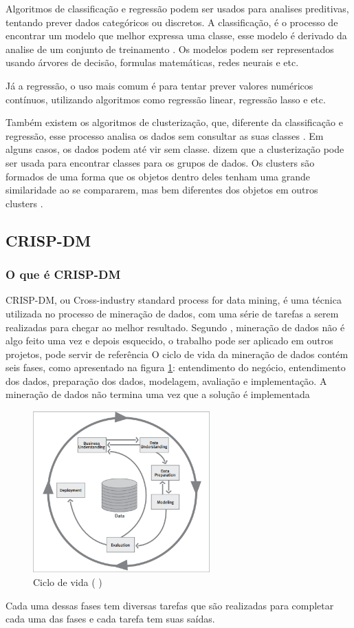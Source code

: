 Algoritmos de classificação e regressão podem ser usados para analises preditivas, tentando prever dados categóricos ou discretos. A classificação, é o processo de encontrar um modelo que melhor expressa uma classe, esse modelo é derivado da analise de um conjunto de treinamento \citep{jmj}. Os modelos podem ser representados usando árvores de decisão, formulas matemáticas, redes neurais e etc.

Já a regressão, o uso mais comum é para tentar prever valores numéricos contínuos, utilizando algoritmos como regressão linear, regressão lasso e etc.

Também existem os algoritmos de clusterização, que, diferente da classificação e regressão, esse processo analisa os dados sem consultar as suas classes \citep{jmj}. Em alguns casos, os dados podem até vir sem classe. \citeauthor{jmj} dizem que a clusterização pode ser usada para encontrar classes para os grupos de dados. Os clusters são formados de uma forma que os objetos dentro deles tenham uma grande similaridade ao se compararem, mas bem diferentes dos objetos em outros clusters \citep{jmj}.

\subsection{CRISP-DM}
\subsubsection{O que é CRISP-DM}
CRISP-DM, ou Cross-industry standard process for data mining, é uma técnica utilizada no processo de mineração de dados, com uma série de tarefas a serem realizadas para chegar ao melhor resultado.
Segundo , mineração de dados não é algo feito uma vez e depois esquecido, o trabalho pode ser aplicado em outros projetos, pode servir de referência
O ciclo de vida da mineração de dados contém seis fases, como apresentado na figura \ref{crispcycle}: entendimento do negócio, entendimento dos dados, preparação dos dados, modelagem, avaliação e implementação. 
A mineração de dados não termina uma vez que a solução é implementada \citep{crispmanual}
\begin{figure}[H]
\centering
\includegraphics[height=6.2cm]{imagens/lifecycle.png}
\caption{Ciclo de vida (\citeauthor{crispmanual} \citeyear{crispmanual})}
\label{crispcycle}
\end{figure}
Cada uma dessas fases tem diversas tarefas que são realizadas para completar cada uma das fases e cada tarefa tem suas saídas.
